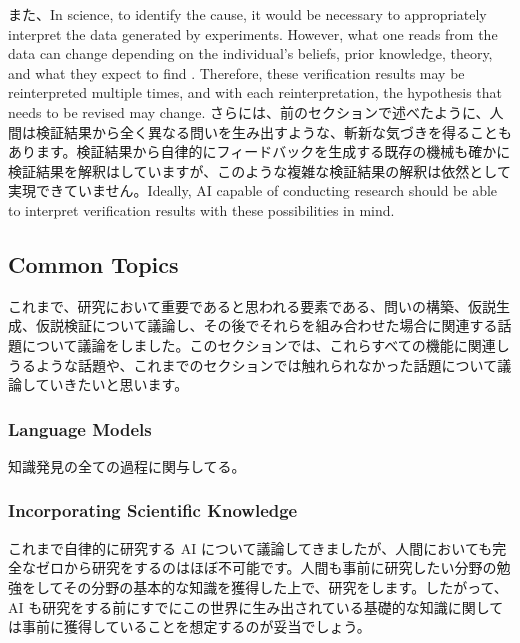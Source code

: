 また、In science, to identify the cause, it would be necessary to appropriately interpret the data generated by experiments. However, what one reads from the data can change depending on the individual's beliefs, prior knowledge, theory, and what they expect to find \cite{hanson1965patterns}. Therefore, these verification results may be reinterpreted multiple times, and with each reinterpretation, the hypothesis that needs to be revised may change. さらには、前のセクションで述べたように、人間は検証結果から全く異なる問いを生み出すような、斬新な気づきを得ることもあります。検証結果から自律的にフィードバックを生成する既存の機械も確かに検証結果を解釈はしていますが、このような複雑な検証結果の解釈は依然として実現できていません。Ideally, AI capable of conducting research should be able to interpret verification results with these possibilities in mind.


\subsection{Common Topics}
これまで、研究において重要であると思われる要素である、問いの構築、仮説生成、仮説検証について議論し、その後でそれらを組み合わせた場合に関連する話題について議論をしました。このセクションでは、これらすべての機能に関連しうるような話題や、これまでのセクションでは触れられなかった話題について議論していきたいと思います。

\subsubsection{Language Models}

知識発見の全ての過程に関与してる。

\subsubsection{Incorporating Scientific Knowledge}

これまで自律的に研究する AI について議論してきましたが、人間においても完全なゼロから研究をするのはほぼ不可能です。人間も事前に研究したい分野の勉強をしてその分野の基本的な知識を獲得した上で、研究をします。したがって、AI も研究をする前にすでにこの世界に生み出されている基礎的な知識に関しては事前に獲得していることを想定するのが妥当でしょう。

